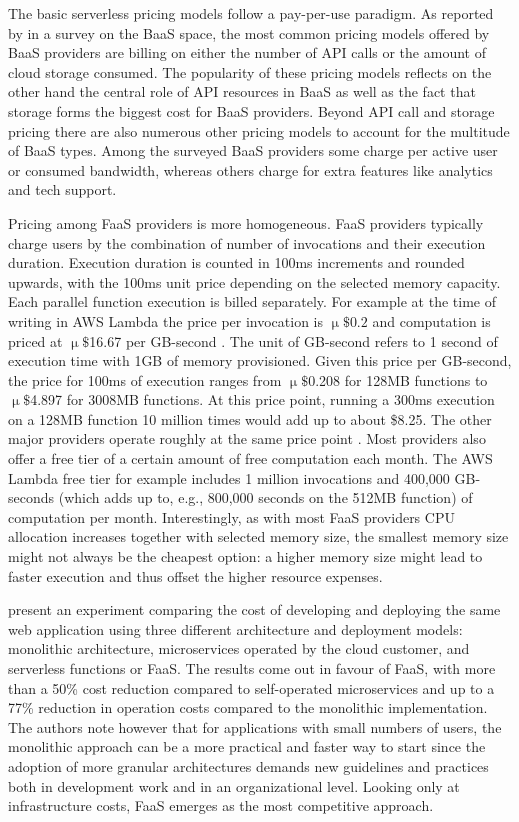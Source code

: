 The basic serverless pricing models follow a pay-per-use paradigm. As reported by \textcite{lane13baas} in a survey on the BaaS space, the most common pricing models offered by BaaS providers are billing on either the number of API calls or the amount of cloud storage consumed. The popularity of these pricing models reflects on the other hand the central role of API resources in BaaS as well as the fact that storage forms the biggest cost for BaaS providers. Beyond API call and storage pricing there are also numerous other pricing models to account for the multitude of BaaS types. Among the surveyed BaaS providers some charge per active user or consumed bandwidth, whereas others charge for extra features like analytics and tech support.

Pricing among FaaS providers is more homogeneous. FaaS providers typically charge users by the combination of number of invocations and their execution duration. Execution duration is counted in 100ms increments and rounded upwards, with the 100ms unit price depending on the selected memory capacity. Each parallel function execution is billed separately. For example at the time of writing in AWS Lambda the price per invocation is $\upmu\$0.2$ and computation is priced at $\upmu\$$16.67 per GB-second \parencite{awslambda0218}. The unit of GB-second refers to 1 second of execution time with 1GB of memory provisioned. Given this price per GB-second, the price for 100ms of execution ranges from $\upmu\$$0.208 for 128MB functions to $\upmu\$$4.897 for 3008MB functions. At this price point, running a 300ms execution on a 128MB function 10 million times would add up to about \$8.25. The other major providers operate roughly at the same price point \parencite{microsoft18azureFunctions,ibm18cloudFunctions,google18cloudFunctions}. Most providers also offer a free tier of a certain amount of free computation each month. The AWS Lambda free tier for example includes 1 million invocations and 400,000 GB-seconds (which adds up to, e.g., 800,000 seconds on the 512MB function) of computation per month. Interestingly, as with most FaaS providers CPU allocation increases together with selected memory size, the smallest memory size might not always be the cheapest option: a higher memory size might lead to faster execution and thus offset the higher resource expenses.

\textcite{villamizar2017cost} present an experiment comparing the cost of developing and deploying the same web application using three different architecture and deployment models: monolithic architecture, microservices operated by the cloud customer, and serverless functions or FaaS. The results come out in favour of FaaS, with more than a 50\% cost reduction compared to self-operated microservices and up to a 77\% reduction in operation costs compared to the monolithic implementation. The authors note however that for applications with small numbers of users, the monolithic approach can be a more practical and faster way to start since the adoption of more granular architectures demands new guidelines and practices both in development work and in an organizational level. Looking only at infrastructure costs, FaaS emerges as the most competitive approach.


